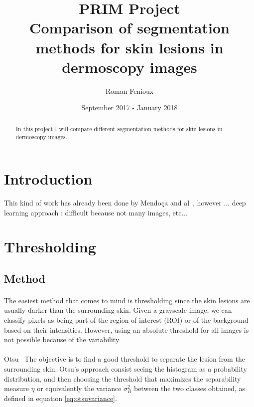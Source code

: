 \documentclass[a4paper,10pt]{article}
\title{PRIM Project\\ Comparison of segmentation methods for skin lesions in dermoscopy images}
\author{Roman Fenioux}
\date{September 2017 - January 2018}
\begin{document}
\maketitle
\newpage
\begin{abstract}
In this project I will compare different segmentation methods for skin lesions in dermoscopy images. 


\end{abstract}
\section*{Introduction}
This kind of work has already been done by Mendoça and al~\cite{mendonca_comparison_2007}, however ... 
deep learning approach : difficult because not many images, etc...

\section{Thresholding}
\subsection{Method}
\paragraph{}
The easiest method that comes to mind is thresholding since the skin lesions are 
usually darker than the surrounding skin. Given a grayscale image, we can 
classify pixels as being part of the region of interest (ROI) or of the 
background based on their intensities. However, using an absolute threshold for all images is not possible because of the variability 
\paragraph{} Otsu~\cite{Otsu1979} 
The objective is to find a good threshold to separate the lesion from the 
surrounding skin. Otsu's approach consist seeing the histogram as a probability 
distribution, and then choosing the threshold that maximizes the separability 
measure $\eta$ or equivalently the variance $\sigma_B^2$ between the two classes 
obtained, as defined in equation \ref{eq:otsuvariance}.
\end{document}
